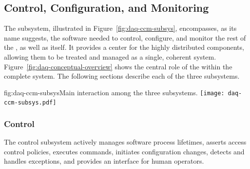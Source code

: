 


\subsection{Control, Configuration, and Monitoring}
\label{sec:fd-daq:design-run-control}


The  subsystem, illustrated in Figure~\ref{fig:daq-ccm-subsys}, encompasses, as its name suggests, the software needed to control, configure, and monitor the rest of the , as well as itself. 
It provides a center for the highly distributed  components, allowing them to be treated and managed as a single, coherent system. 
Figure~\ref{fig:daq-conceptual-overview} shows the central role of the  within the complete  system.
The following sections describe each of the three  subsystems. 

\begin{dunefigure}{fig:daq-ccm-subsys}{Main interaction among the three  subsystems.}
  \texttt{[image: daq-ccm-subsys.pdf]}
\end{dunefigure}

\subsubsection{Control}
\label{sec:daq:design:ccm:control}


The  control subsystem actively manages  software process lifetimes, asserts access control policies, executes commands, initiates configuration changes, detects and handles exceptions, and provides an interface for human operators.


